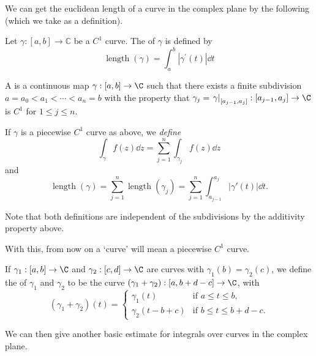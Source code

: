We can get the euclidean length of a curve in the complex plane by the following (which we take as a definition).

\begin{definition}
Let $\gamma:[a, b] \rightarrow \mathbb{C}$ be a $C^{1}$ curve. The  of $\gamma$ is defined by
$$
\operatorname{length}(\gamma)=\int_{a}^{b}\left|\gamma^{\prime}(t)\right| \dd t
$$
\end{definition}

\begin{definition}
    A  is a continuous map $\gamma: [a, b] \rightarrow \C$ such that there exists a finite subdivision
    $a = a_0 < a_1 < \cdots < a_n = b$ with the property that $\gamma_j = \left.\gamma\right|_{[a_{j - 1}, a_j]}: [a_{j - 1}, a_j] \rightarrow \C$ is $C^1$ for $1 \leq j \leq n$.
\end{definition}

If $\gamma$ is a piecewise $C^1$ curve as above, we \emph{define}
$$
\int_\gamma f(z) \dd z = \sum_{j = 1}^n \int_{\gamma_j} f(z) \dd z
$$
and
$$
\operatorname{length}(\gamma) = \sum_{j = 1}^{n} \operatorname{length}(\gamma_j) = \sum_{j = 1}^n \int_{a_{j - 1}}^{a_j} |\gamma'(t)| \dd t.
$$

\begin{remark}
    Note that both definitions are independent of the subdivisions by the additivity property above.
\end{remark}

With this, from now on a `curve' will mean a piecewise $C^1$ curve.

\begin{definition}
    If $\gamma_1: [a, b] \rightarrow \C$ and $\gamma_2 : [c, d] \rightarrow \C$ are curves with $\gamma_1(b) = \gamma_2(c)$, we define the  of $\gamma_1$ and $\gamma_2$ to be the curve $(\gamma_1 + \gamma_2): [a, b + d - c] \rightarrow \C$, with
    $$
    (\gamma_1 + \gamma_2)(t) = \begin{cases}
        \gamma_1(t) &\mbox{if } a \leq t \leq b, \\
        \gamma_2(t - b + c) &\mbox{if } b \leq t \leq b + d - c.
       \end{cases}
    $$
\end{definition}

We can then give another basic estimate for integrals over curves in the complex plane.

